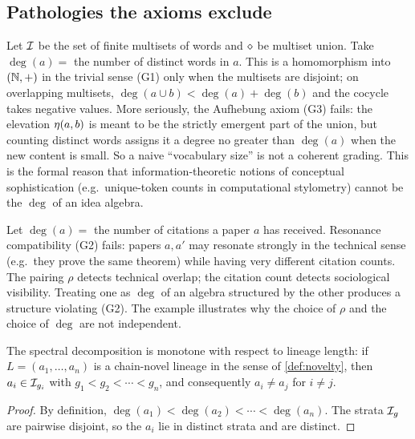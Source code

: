 \subsection*{Pathologies the axioms exclude}

\begin{example}\label{ex:bow-fail}
Let $\mathcal{I}$ be the set of finite multisets of words and $\mathbin{\diamond}$ be
multiset union. Take $\deg(a) =$ the number of distinct words in $a$.
This is a homomorphism into $(\mathbb{N},+)$ in the trivial sense (G1) only
when the multisets are disjoint; on overlapping multisets, $\deg(a\cup
b) < \deg(a) + \deg(b)$ and the cocycle takes negative values. More
seriously, the Aufhebung axiom (G3) fails: the elevation
$\eta(a,b)$ is meant to be the strictly emergent part of the
union, but counting distinct words assigns it a degree no greater than
$\deg(a)$ when the new content is small. So a naive ``vocabulary
size'' is not a coherent grading. This is the formal reason that
information-theoretic notions of conceptual sophistication (e.g.\
unique-token counts in computational stylometry) cannot be the $\deg$
of an idea algebra.
\end{example}

\begin{example}\label{ex:citation-fail}
Let $\deg(a) = $ the number of citations a paper $a$ has received.
Resonance compatibility (G2) fails: papers $a,a'$ may resonate
strongly in the technical sense (e.g.\ they prove the same theorem)
while having very different citation counts. The pairing $\rho$
detects technical overlap; the citation count detects sociological
visibility. Treating one as $\deg$ of an algebra structured by the
other produces a structure violating (G2). The example illustrates
why the choice of $\rho$ and the choice of $\deg$ are not
independent.
\end{example}

\begin{proposition}\label{prop:anderson}
The spectral decomposition is monotone with respect to lineage length:
if $L = (a_1,\dots,a_n)$ is a chain-novel lineage in the sense of
\cref{def:novelty}, then $a_i \in \mathcal{I}_{g_i}$ with $g_1 < g_2 <
\cdots < g_n$, and consequently $a_i \neq a_j$ for $i\neq j$.
\end{proposition}

\begin{proof}
By definition, $\deg(a_1) < \deg(a_2) < \cdots < \deg(a_n)$. The strata
$\mathcal{I}_g$ are pairwise disjoint, so the $a_i$ lie in distinct strata
and are distinct.
\end{proof}

